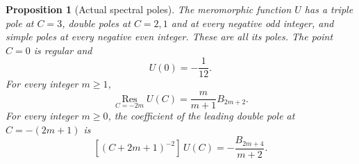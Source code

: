\documentclass[11pt]{article}
\numberwithin{equation}{section}
\theoremstyle{plain}
\newtheorem{proposition}[theorem]{Proposition}
\theoremstyle{definition}
\theoremstyle{remark}
\begin{document}
\begin{proposition}[Actual spectral poles]
\label{mxex:poles}
The meromorphic function $U$ has a triple pole at $C=3$, double poles
at $C=2,1$ and at every negative odd integer, and simple poles at
every negative even integer.  These are all its poles.  The point
$C=0$ is regular and
\begin{equation}\label{mxex:zero-value}
 U(0)=-\frac1{12}.
\end{equation}
For every integer $m\geq1$,
\begin{equation}\label{mxex:even-residue}
 \operatorname*{Res}_{C=-2m}U(C)
       =\frac{m}{m+1}B_{2m+2}.
\end{equation}
For every integer $m\geq0$, the coefficient of the leading double
pole at $C=-(2m+1)$ is
\begin{equation}\label{mxex:odd-leading}
 [(C+2m+1)^{-2}]\,U(C)
       =-\frac{B_{2m+4}}{m+2}.
\end{equation}
\end{proposition}
\end{document}
